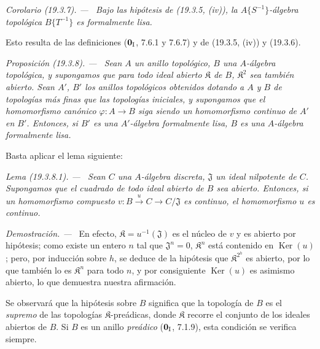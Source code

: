 \documentclass[10pt,oneside]{book}
\makeatletter
\newcommand{\setmanualcurrentlabel}[1]{\def\@currentlabel{#1}}
\newenvironment{proposition}[1][]{%
  \setmanualcurrentlabel{#1}\par\medskip\noindent\itshape Proposición (#1). ---\ }{\par}
\newenvironment{corollary}[1][]{%
  \setmanualcurrentlabel{#1}\par\medskip\noindent\itshape Corolario (#1). ---\ }{\par}
\newenvironment{lemma}[1][]{%
  \setmanualcurrentlabel{#1}\par\medskip\noindent\itshape Lema (#1). ---\ }{\par}
\newenvironment{proof}{%
  \par\medskip\noindent\textit{Demostración. ---\ }}{\par}
\makeatother
\begin{document}
\begin{corollary}[19.3.7]
\label{0.19.3.7-es}
Bajo las hipótesis de \textup{(19.3.5, (iv))}, la $A\{S^{-1}\}$-álgebra topológica
$B\{T^{-1}\}$ es formalmente lisa.
\end{corollary}

Esto resulta de las definiciones ($\mathbf 0_{\rm I}$, 7.6.1 y 7.6.7) y de
(19.3.5, (iv)) y (19.3.6).

\begin{proposition}[19.3.8]
\label{0.19.3.8-es}
Sean $A$ un anillo topológico, $B$ una $A$-álgebra topológica, y supongamos
que para todo ideal abierto $\mathfrak K$ de $B$, $\mathfrak K^2$ sea también
abierto. Sean $A'$, $B'$ los anillos topológicos obtenidos dotando a $A$ y
$B$ de topologías más finas que las topologías iniciales, y supongamos que
el homomorfismo canónico $\varphi:A\to B$ siga siendo un homomorfismo
continuo de $A'$ en $B'$. Entonces, si $B'$ es una $A'$-álgebra formalmente
lisa, $B$ es una $A$-álgebra formalmente lisa.
\end{proposition}

Basta aplicar el lema siguiente:

\begin{lemma}[19.3.8.1]
\label{0.19.3.8.1-es}
Sean $C$ una $A$-álgebra discreta, $\mathfrak J$ un ideal nilpotente de $C$.
Supongamos que el cuadrado de todo ideal abierto de $B$ sea abierto. Entonces, si un
homomorfismo compuesto
$v:B\xrightarrow{u}C\to C/\mathfrak J$ es continuo, el homomorfismo $u$
es continuo.
\end{lemma}

\begin{proof}
En efecto, $\mathfrak K=u^{-1}(\mathfrak J)$ es el núcleo de $v$ y es
abierto por hipótesis; como existe un entero $n$ tal que
$\mathfrak J^n=0$, $\mathfrak K^n$ está contenido en
$\operatorname{Ker}(u)$; pero, por inducción sobre $h$, se deduce de
la hipótesis que $\mathfrak K^{2^h}$ es abierto, por lo que también lo es
$\mathfrak K^n$ para todo $n$, y por consiguiente $\operatorname{Ker}(u)$ es
asimismo abierto, lo que demuestra nuestra afirmación.
\end{proof}

Se observará que la hipótesis sobre $B$ significa que la topología de $B$ es el
\emph{supremo} de las topologías $\mathfrak K$-preádicas, donde $\mathfrak K$ recorre
el conjunto de los ideales abiertos de $B$. Si $B$ es un anillo \emph{preádico}
($\mathbf 0_{\rm I}$, 7.1.9), esta condición se verifica siempre.
\end{document}
